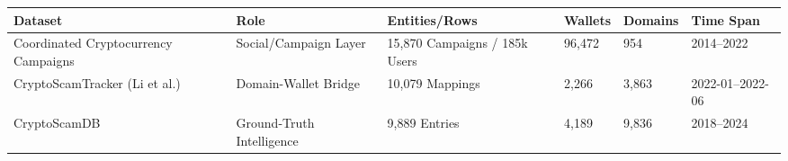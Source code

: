 \begin{tabular}{llllll}
\toprule
Dataset & Role & Entities/Rows & Wallets & Domains & Time Span \\
\midrule
Coordinated Cryptocurrency Campaigns & Social/Campaign Layer & 15,870 Campaigns / 185k Users & 96,472 & 954 & 2014--2022 \\
CryptoScamTracker (Li et al.) & Domain-Wallet Bridge & 10,079 Mappings & 2,266 & 3,863 & 2022-01--2022-06 \\
CryptoScamDB & Ground-Truth Intelligence & 9,889 Entries & 4,189 & 9,836 & 2018--2024 \\
\bottomrule
\end{tabular}
